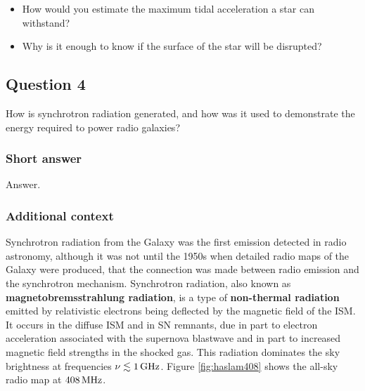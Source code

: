 \documentclass[a4paper,10pt]{article}
\begin{document}
\begin{itemize}
    \item How would you estimate the maximum tidal acceleration a star can withstand?
    \item Why is it enough to know if the surface of the star will be disrupted?
\end{itemize}


\newpage
\subsection{Question 4}

How is synchrotron radiation generated, and how was it used to demonstrate the energy required to power radio galaxies?

\subsubsection{Short answer}

Answer.

\subsubsection{Additional context}

Synchrotron radiation from the Galaxy was the first emission detected in radio astronomy, although it was not until the 1950s when detailed radio maps of the Galaxy were produced, that the connection was made between radio emission and the synchrotron mechanism. Synchrotron radiation, also known as \textbf{magnetobremsstrahlung radiation}, is a type of \textbf{non-thermal radiation} emitted by relativistic electrons being deflected by the magnetic field of the ISM. It occurs in the diffuse ISM and in SN remnants, due in part to electron acceleration associated with the supernova blastwave and in part to increased magnetic field strengths in the shocked gas. This radiation dominates the sky brightness at frequencies $\nu\lesssim1\,{\rm GHz}$. Figure \ref{fig:haslam408} shows the all-sky radio map at $408\,{\rm MHz}$.
\end{document}
